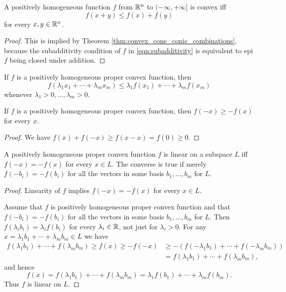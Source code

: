 \documentclass[11pt,a4paper]{article}
\begin{document}
\begin{theorem}
    A positively homogeneous function $f$ from $\mathbb{R}^n$ to $(-\infty,+\infty]$ is convex iff
    \begin{equation}\label{eqn:subadditivity}
        f(x+y) \le f(x) + f(y)
    \end{equation}
    for every $x,y\in\mathbb{R}^n$.
\end{theorem}

\begin{proof}
    This is implied by Theorem \ref{thm:convex_cone_conic_combinations}, because the subadditivity condition of $f$ in \eqref{eqn:subadditivity} is equivalent to epi $f$ being closed under addition.
\end{proof}

\begin{corollary}
    If $f$ is a positively homogeneous proper convex function, then
    \begin{equation*}
        f(\lambda_1 x_1+\cdots+\lambda_m x_m) \le \lambda_1 f(x_1) + \cdots + \lambda_m f(x_m)
    \end{equation*}
    whenever $\lambda_1>0,\ldots,\lambda_m>0$.
\end{corollary}

\begin{corollary}
    If $f$ is a positively homogeneous proper convex function, then $f(-x) \ge -f(x)$ for every $x$.
\end{corollary}

\begin{proof}
    We have $f(x)+f(-x) \ge f(x-x) = f(0) \ge 0$.
\end{proof}

\begin{theorem}
    A positively homogeneous proper convex function $f$ is linear on a subspace $L$ iff $f(-x) = -f(x)$ for every $x\in L$. The converse is true if merely $f(-b_i) = -f(b_i)$ for all the vectors in some basis $b_1,\ldots,b_m$ for $L$.
\end{theorem}

\begin{proof}
    \forward Linearity of $f$ implies $f(-x)=-f(x)$ for every $x\in L$. 
    
    \noindent\converse Assume that $f$ is positively homogeneous proper convex function and that $f(-b_i) = -f(b_i)$ for all the vectors in some basis $b_1,\ldots,b_m$ for $L$. Then $f(\lambda_i b_i) = \lambda_i f(b_i)$ for every $\lambda_i \in \mathbb{R}$, not just for $\lambda_i>0$. For any $x = \lambda_1 b_1+\cdots+\lambda_m b_m\in L$ we have
    \begin{align*}
        f(\lambda_1 b_1) + \cdots + f(\lambda_m b_m) \ge f(x) \ge -f(-x) &\ge -(f(-\lambda_1 b_1) + \cdots + f(-\lambda_m b_m)) \\
        &= f(\lambda_1 b_1) + \cdots + f(\lambda_m b_m),
    \end{align*}
    and hence 
    \begin{equation*}
        f(x) = f(\lambda_1 b_1)+ \cdots + f(\lambda_m b_m) = \lambda_1 f(b_1) + \cdots + \lambda_m f(b_m).
    \end{equation*}
    Thus $f$ is linear on $L$.
\end{proof}
\end{document}

